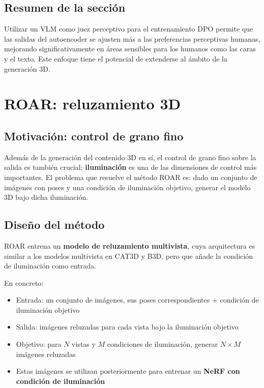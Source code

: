 \documentclass[a4paper]{article}
\begin{document}
\subsection{Resumen de la sección}

Utilizar un VLM como juez perceptivo para el entrenamiento DPO permite que las salidas del autoencoder se ajusten más a las preferencias perceptivas humanas, mejorando significativamente en áreas sensibles para los humanos como las caras y el texto. Este enfoque tiene el potencial de extenderse al ámbito de la generación 3D.


\section{ROAR: reluzamiento 3D}

\subsection{Motivación: control de grano fino}

Además de la generación del contenido 3D en sí, el control de grano fino sobre la salida es también crucial; \textbf{iluminación} es una de las dimensiones de control más importantes. El problema que resuelve el método ROAR es: dado un conjunto de imágenes con poses y una condición de iluminación objetivo, generar el modelo 3D bajo dicha iluminación.

\subsection{Diseño del método}

ROAR entrena un \textbf{modelo de reluzamiento multivista}, cuya arquitectura es similar a los modelos multivista en CAT3D y B3D, pero que añade la condición de iluminación como entrada.

En concreto:
\begin{itemize}
    \item Entrada: un conjunto de imágenes, sus poses correspondientes + condición de iluminación objetivo
    \item Salida: imágenes reluzadas para cada vista bajo la iluminación objetivo
    \item Objetivo: para $N$ vistas y $M$ condiciones de iluminación, generar $N \times M$ imágenes reluzadas
    \item Estas imágenes se utilizan posteriormente para entrenar un \textbf{NeRF con condición de iluminación}
\end{itemize}
\end{document}

